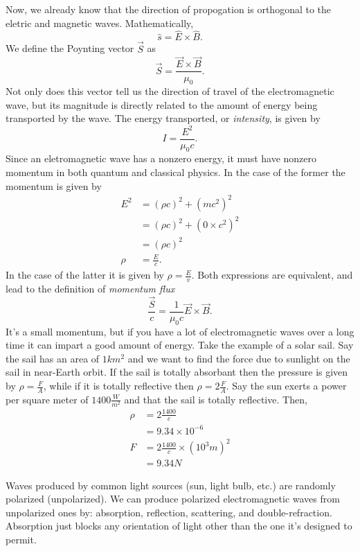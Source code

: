 \documentclass[nobib]{tufte-handout}
\begin{document}
Now, we already know that the direction of propogation is orthogonal to the 
eletric and magnetic waves. Mathematically, 
\[\hat{s} = \hat{E} \times \hat{B}.\]
We define the Poynting vector $\vec{S}$ as
\[\vec{S} = \frac{\vec{E}\times \vec{B}}{\mu_0}.\]
Not only does this vector tell us the direction of travel of the electromagnetic wave, 
but its magnitude is directly related to the amount of energy being transported by the wave. 
The energy transported, or \emph{intensity}, is given by 
\[I = \frac{E^2}{\mu_0 c}.\]
Since an eletromagnetic wave has a nonzero energy, it must have nonzero 
momentum in both quantum and classical physics. In the case of the former 
the momentum is given by 
\begin{align*}
    E^2 &= (\rho c)^2 + (mc^2)^2 \\
    &= (\rho c)^2 + (0\times c^2)^2 \\
    &= (\rho c)^2 \\
    \rho &= \frac{E}{c}.
\end{align*}
In the case 
of the latter it is given by $\rho = \frac{E}{v}$. Both expressions 
are equivalent, and lead to the definition of \emph{momentum flux}
\[\frac{\vec{S}}{c} = \frac{1}{\mu_0 c} \vec{E} \times \vec{B}.\]
It's a small momentum, but if you have a lot of electromagnetic waves 
over a long time it can impart a good amount of energy. Take the 
example of a solar sail. Say the sail has an area of $1 km^2$ and we want 
to find the force due to sunlight on the sail in near-Earth orbit. 
If the sail is totally absorbant then the pressure is given by 
$\rho = \frac{F}{A}$, while if it is totally reflective then 
$\rho = 2\frac{F}{A}$. Say the sun exerts a power per square meter of 
$1400 \frac{W}{m^2}$ and that the sail is totally reflective. Then, 
\begin{align*}
    \rho &= 2\frac{1400}{c} \\
    &= 9.34\times 10^{-6} \\
    F &= 2\frac{1400}{c} \times (10^3 m)^2 \\
    &= 9.34 N 
\end{align*}

Waves produced by common light sources (sun, light bulb, etc.) are randomly
polarized (unpolarized). We can produce polarized electromagnetic waves from unpolarized ones by:
absorption, reflection, scattering, and double-refraction. Absorption 
just blocks any orientation of light other than the one it's designed to 
permit. 

\end{document}
